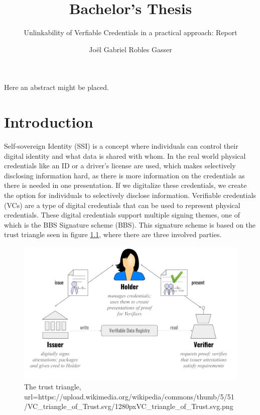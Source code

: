 \documentclass[
	a4paper               %
	,BCOR=0mm            %
	,bibliography=totoc   %
	,listof=totoc         %
	,monolingual
	,twoside=false
]{bfhthesis}              %
\begin{document}
\frontmatter

\title{Bachelor's Thesis}
\subtitle{Unlinkability of Verfiable Credentials in a practical approach: Report}
\author{Joël Gabriel Robles Gasser}

\maketitle

Here an abstract might be placed.


\tableofcontents

\mainmatter

\chapter{Introduction}
Self-sovereign Identity (SSI)\cite{self-sovereign-identity} is a concept where individuals can control their digital identity and what data is shared with whom.
In the real world physical credentials like an ID or a driver's license are used, which makes selectively disclosing information hard, as there is more information on the credentials as there is needed in one presentation.
If we digitalize these credentials, we create the option for individuals to selectively disclose information. 
Verifiable credentials (VCs)\cite{verifiable-credentials} are a type of digital credentials that can be used to represent physical credentials.
These digital credentials support multiple signing themes, one of which is the BBS Signature scheme (BBS)\cite{bbs-signature-scheme}.
This signature scheme is based on the trust triangle seen in figure \ref{fig:trusttringle}, where there are three involved parties.

\begin{figure}[h]
	\centering
	\includegraphics[width=12cm]{./img/trusttriangle.png}
	\caption{The trust triangle, url={https://upload.wikimedia.org/wikipedia/commons/thumb/5/51/VC\_triangle\_of\_Trust.svg/1280px\-VC\_triangle\_of\_Trust.svg.png}}
	\label{fig:trusttringle}
\end{figure}
\end{document}
